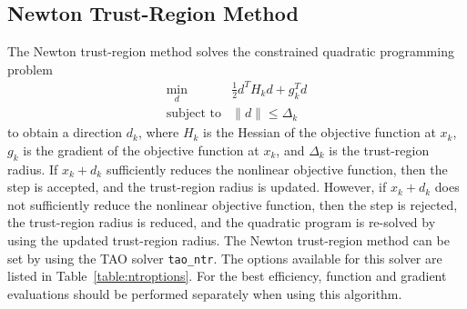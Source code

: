 \subsection{Newton Trust-Region Method}

The Newton trust-region method solves the constrained quadratic programming
problem
\[
\begin{array}{ll}
\min_d  & \frac{1}{2}d^T H_k d  + g_k^T d \\
\mbox{subject to} & \|d\| \leq \Delta_k
\end{array}
\]
to obtain a direction $d_k$, where $H_k$ is the Hessian of the objective 
function at $x_k$, $g_k$ is the gradient of the objective function at $x_k$, 
and $\Delta_k$ is the trust-region radius.  If $x_k + d_k$ sufficiently 
reduces the nonlinear objective function, then the step is accepted, and the 
trust-region radius is updated.  However, if $x_k + d_k$ does not
sufficiently
reduce the nonlinear objective function, then the step is rejected, the 
trust-region radius is reduced, and the quadratic program is re-solved 
by using the updated trust-region radius. The Newton trust-region method 
can be set by using the TAO solver {\tt tao\_ntr}. The options available 
for this solver are listed in Table~\ref{table:ntroptions}. For the best 
efficiency, 
function and gradient evaluations should be performed separately when 
using this algorithm.

